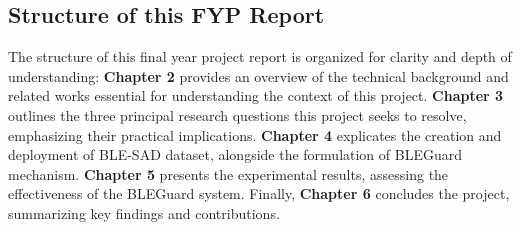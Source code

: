 \vspace{2pt}

\subsection{Structure of this FYP Report}


\noindent The structure of this final year project report is organized for clarity and depth of understanding: \textbf{Chapter 2} provides an overview of the technical background and related works essential for understanding the context of this project. \textbf{Chapter 3} outlines the three principal research questions this project seeks to resolve, emphasizing their practical implications. \textbf{Chapter 4} explicates the creation and deployment of BLE-SAD dataset, alongside the formulation of BLEGuard mechanism. \textbf{Chapter 5} presents the experimental results, assessing the effectiveness of the BLEGuard system. Finally, \textbf{Chapter 6} concludes the project, summarizing key findings and contributions.


\newpage